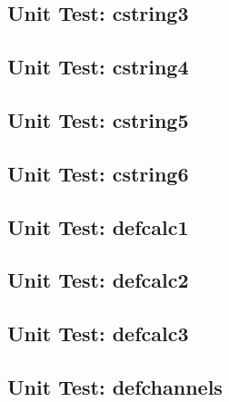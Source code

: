 \subsection*{Unit Test: cstring3}

 \clearpage
\subsection*{Unit Test: cstring4}

 \clearpage
\subsection*{Unit Test: cstring5}

 \clearpage
\subsection*{Unit Test: cstring6}

 \clearpage
\subsection*{Unit Test: defcalc1}

 \clearpage
\subsection*{Unit Test: defcalc2}

 \clearpage
\subsection*{Unit Test: defcalc3}

 \clearpage
\subsection*{Unit Test: defchannels}

 \clearpage
